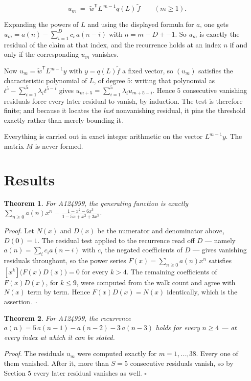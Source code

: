 \documentclass[11pt]{article}
\newtheorem{theorem}{Theorem}
\theoremstyle{definition}
\begin{document}
\[u_m \;=\; \tilde w^{\mathsf T} L^{\,m-1} q(L)\,\tilde f \qquad (m \ge 1).\]

Expanding the powers of $L$ and using the displayed formula for $a$, one gets $u_m = a(n) - \sum_{i=1}^{D} c_i\,a(n-i)$ with $n = m + D + -1$. So $u_m$ is exactly the residual of the claim at that index, and the recurrence holds at an index $n$ if and only if the corresponding $u_m$ vanishes.

Now $u_m = \tilde w^{\mathsf T} L^{m-1} y$ with $y = q(L)\tilde f$ a fixed vector, so $(u_m)$ satisfies the characteristic polynomial of $L$, of degree $5$: writing that polynomial as $t^{5} - \sum_{i=1}^{5} \lambda_i t^{5-i}$ gives $u_{m+5} = \sum_{i=1}^{5} \lambda_i u_{m+5-i}$. Hence $5$ consecutive vanishing residuals force every later residual to vanish, by induction. The test is therefore finite; and because it locates the {\itshape last} nonvanishing residual, it pins the threshold exactly rather than merely bounding it.

Everything is carried out in exact integer arithmetic on the vector $L^{m-1}y$. The matrix $M$ is never formed.

\section{Results}

\begin{theorem} For A124999, the generating function is exactly $\sum_{n\ge 0} a(n)x^n = \frac{1 - x^{2} - 6x^{3}}{1 - 5x + x^{2} + 3x^{3}}$.\end{theorem}

{\itshape Proof.} Let $N(x)$ and $D(x)$ be the numerator and denominator above, $D(0)=1$. The residual test applied to the recurrence read off $D$ --- namely $a(n) = \sum_i c_i a(n-i)$ with $c_i$ the negated coefficients of $D$ --- gives vanishing residuals throughout, so the power series $F(x)=\sum_{n\ge 0}a(n)x^n$ satisfies $[x^k]\bigl(F(x)D(x)\bigr) = 0$ for every $k > 4$. The remaining coefficients of $F(x)D(x)$, for $k \le 9$, were computed from the walk count and agree with $N(x)$ term by term. Hence $F(x)D(x) = N(x)$ identically, which is the assertion. $\square$

\begin{theorem} For A124999, the recurrence $a(n) = 5\,a(n-1) - a(n-2) - 3\,a(n-3)$ holds for every $n \ge 4$ --- at every index at which it can be stated.\end{theorem}

{\itshape Proof.} The residuals $u_m$ were computed exactly for $m = 1,\dots,38$. Every one of them vanished. After it, more than $S = 5$ consecutive residuals vanish, so by Section 5 every later residual vanishes as well. $\square$
\end{document}
